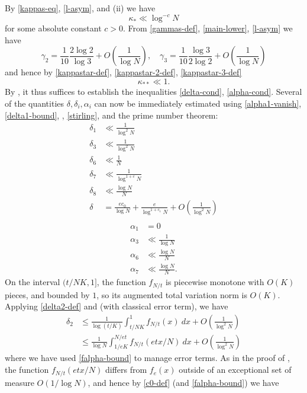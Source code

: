 \documentclass[12pt,a4paper,reqno]{amsart}
\numberwithin{equation}{section}
\theoremstyle{plain}
\theoremstyle{definition}
\begin{document}
By \eqref{kappas-eq}, \eqref{l-asym}, and (ii) we have
$$ \kappa_* \ll \log^{-c} N$$
for some absolute constant $c>0$.  From \eqref{gammas-def}, \eqref{main-lower}, \eqref{l-asym} we have
$$ \gamma_2 = \frac{1}{10} \frac{2\log 2}{\log 3} + O\left(\frac{1}{\log N}\right), \quad
 \gamma_3 = \frac{1}{10} \frac{\log 3}{2\log 2} + O\left(\frac{1}{\log N}\right)
$$
and hence by \eqref{kappastar-def},  \eqref{kappastar-2-def}, \eqref{kappastar-3-def}
$$ \kappa_{**} \ll 1.$$
By , it thus suffices to establish the inequalities \eqref{delta-cond}, \eqref{alpha-cond}.
Several of the quantities $\delta, \delta_i, \alpha_i$ can now be immediately estimated using \eqref{alpha1-vanish}, \eqref{delta1-bound}, , \eqref{stirling}, and the prime number theorem:
\begin{align*}
  \delta_1 &\ll \frac{1}{\log^2 N} \\
  \delta_3 &\ll \frac{1}{\log^2 N} \\
  \delta_6 &\ll \frac{1}{N} \\
  \delta_7 &\ll \frac{1}{\log^{1+c} N} \\
  \delta_8 &\ll \frac{\log N}{N} \\
  \delta &= \frac{ec_0}{\log N} + \frac{e}{\log^{1+c_1} N} + O\left( \frac{1}{\log^2 N} \right)\\  
\end{align*}
\begin{align*}
  \alpha_1 &= 0 \\
  \alpha_3 &\ll \frac{1}{\log N} \\
  \alpha_6 &\ll \frac{\log N}{N} \\
  \alpha_7 &\ll \frac{\log N}{N}.
\end{align*}
On the interval $(t/NK,1]$, the function $f_{N/t}$ is piecewise monotone with $O(K)$ pieces, and bounded by $1$, so its augmented total variation norm is $O(K)$.  Applying \eqref{delta2-def} and  (with classical error term), we have
\begin{align*}
\delta_2 &\leq \frac{1}{\log(t/K)} \int_{t/NK}^1 f_{N/t}(x)\ dx + O\left( \frac{1}{\log^2 N} \right) \\
&\leq \frac{1}{\log N} \int_{1/eK}^{N/et} f_{N/t}(etx/N)\ dx + O\left( \frac{1}{\log^2 N} \right)
\end{align*}
where we have used \eqref{falpha-bound} to manage error terms.
As in the proof of , the function $f_{N/t}(etx/N)$ differs from $f_e(x)$ outside of an exceptional set of measure $O(1/\log N)$, and hence by \eqref{c0-def} (and \eqref{falpha-bound}) we have
\end{document}
